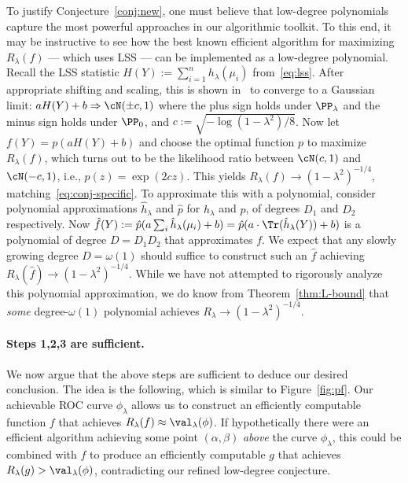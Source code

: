 \documentclass[11pt]{article}
\begin{document}
\begin{remark}
To justify Conjecture~\ref{conj:new}, one must believe that low-degree polynomials capture the most powerful approaches in our algorithmic toolkit. To this end, it may be instructive to see how the best known efficient algorithm for maximizing $R_\lambda(f)$ --- which uses LSS --- can be implemented as a low-degree polynomial. Recall the LSS statistic $H(Y) := \sum_{i=1}^n h_\lambda(\mu_i)$ from~\eqref{eq:lss}. After appropriate shifting and scaling, this is shown in~\cite{weak-wigner} to converge to a Gaussian limit: $a H(Y) + b \Rightarrow \cN(\pm c,1)$ where the plus sign holds under $\PP_\lambda$ and the minus sign holds under $\PP_0$, and $c := \sqrt{-\log(1-\lambda^2)/8}$. Now let $f(Y) = p(aH(Y)+b)$ and choose the optimal function $p$ to maximize $R_\lambda(f)$, which turns out to be the likelihood ratio between $\cN(c,1)$ and $\cN(-c,1)$, i.e., $p(z) = \exp(2cz)$. This yields $R_\lambda(f) \to (1-\lambda^2)^{-1/4}$, matching~\eqref{eq:conj-specific}. To approximate this with a polynomial, consider polynomial approximations $\hat{h}_\lambda$ and $\hat{p}$ for $h_\lambda$ and $p$, of degrees $D_1$ and $D_2$ respectively. Now $\hat{f}(Y) := \hat{p}(a\sum_i \hat{h}_\lambda(\mu_i) + b) = \hat{p}(a \cdot \Tr(\hat{h}_\lambda(Y)) + b)$ is a polynomial of degree $D = D_1 D_2$ that approximates $f$. We expect that any slowly growing degree $D = \omega(1)$ should suffice to construct such an $\hat{f}$ achieving $R_\lambda(\hat{f}) \to (1-\lambda^2)^{-1/4}$. While we have not attempted to rigorously analyze this polynomial approximation, we do know from Theorem~\ref{thm:L-bound} that \emph{some} degree-$\omega(1)$ polynomial achieves $R_\lambda \to (1-\lambda^2)^{-1/4}$.
\end{remark}




\paragraph{Steps 1,2,3 are sufficient.}

We now argue that the above steps are sufficient to deduce our desired conclusion. The idea is the following, which is similar to Figure~\ref{fig:pf}. Our achievable ROC curve $\phi_\lambda$ allows us to construct an efficiently computable function $f$ that achieves $R_\lambda(f) \approx \val_\lambda(\phi)$. If hypothetically there were an efficient algorithm achieving some point $(\alpha,\beta)$ \emph{above} the curve $\phi_\lambda$, this could be combined with $f$ to produce an efficiently computable $g$ that achieves $R_\lambda(g) > \val_\lambda(\phi)$, contradicting our refined low-degree conjecture.
\end{document}
